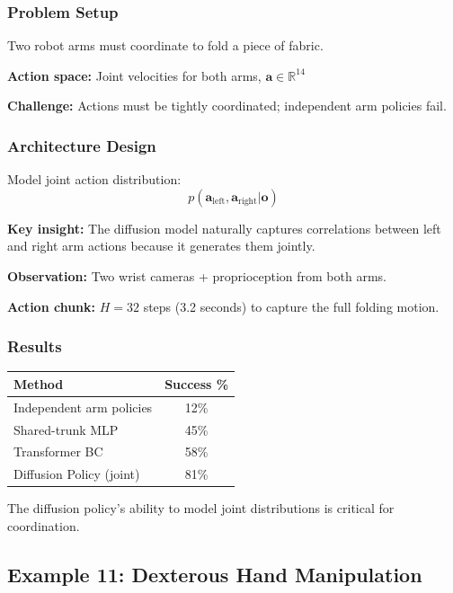 \subsubsection{Problem Setup}

Two robot arms must coordinate to fold a piece of fabric.

\textbf{Action space:} Joint velocities for both arms, $\mathbf{a} \in \mathbb{R}^{14}$

\textbf{Challenge:} Actions must be tightly coordinated; independent arm policies fail.

\subsubsection{Architecture Design}

Model joint action distribution:
\begin{equation}
p(\mathbf{a}_{\text{left}}, \mathbf{a}_{\text{right}} | \mathbf{o})
\label{eq:bimanual_distribution}
\end{equation}

\textbf{Key insight:} The diffusion model naturally captures correlations between left and right arm actions because it generates them jointly.

\textbf{Observation:} Two wrist cameras + proprioception from both arms.

\textbf{Action chunk:} $H = 32$ steps (3.2 seconds) to capture the full folding motion.

\subsubsection{Results}

\begin{center}
\begin{tabular}{lc}
\toprule
\textbf{Method} & \textbf{Success \%} \\
\midrule
Independent arm policies & 12\% \\
Shared-trunk MLP & 45\% \\
Transformer BC & 58\% \\
Diffusion Policy (joint) & 81\% \\
\bottomrule
\end{tabular}
\end{center}

The diffusion policy's ability to model joint distributions is critical for coordination.

\subsection{Example 11: Dexterous Hand Manipulation}
\label{subsec:example_dexterous}

